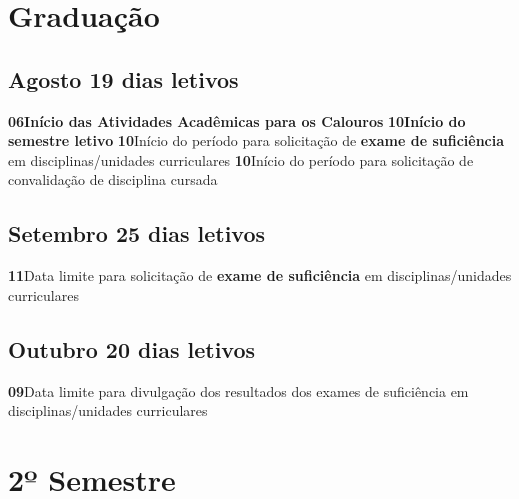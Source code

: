 \documentclass[thesis]{hmcposter}
\begin{document}
\begin{poster}
\section{\color{hmcorange}Graduação}\subsection{Agosto \hfill 19 dias letivos}\textbf{06}\qquad \textbf{Início das Atividades Acadêmicas para os Calouros} \newline \null\textbf{10}\qquad \textbf{Início do semestre letivo} \newline \null\textbf{10}\qquad Início do período para solicitação de \textbf{exame de suficiência} em disciplinas/unidades curriculares \newline \null\textbf{10}\qquad Início do período para solicitação de convalidação de disciplina cursada \newline \null\subsection{Setembro \hfill 25 dias letivos}\textbf{11}\qquad Data limite para solicitação de \textbf{exame de suficiência} em disciplinas/unidades curriculares \newline \null\subsection{Outubro \hfill 20 dias letivos}\textbf{09}\qquad Data limite para divulgação dos resultados dos exames de suficiência em disciplinas/unidades curriculares \newline \null\vfill\null
\columnbreak
\section{\hfill \color{hmcorange}2º Semestre}

\end{poster}
\end{document}
